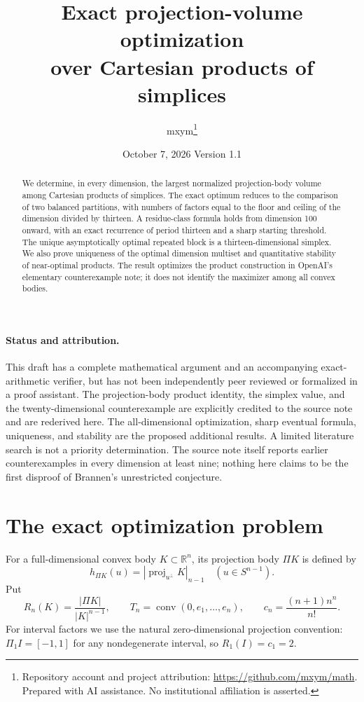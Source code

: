 \documentclass[11pt]{article}
\title{Exact projection-volume optimization\\over Cartesian products of simplices}
\author{mxym\thanks{Repository account and project attribution: \url{https://github.com/mxym/math}. Prepared with AI assistance. No institutional affiliation is asserted.}}
\date{October 7, 2026 \quad Version 1.1}
\theoremstyle{remark}\newtheorem{remark}[theorem]{Remark}
\newcommand{\R}{\mathbb R}\newcommand{\N}{\mathbb N}\newcommand{\Z}{\mathbb Z}
\DeclareMathOperator{\conv}{conv}
\begin{document}
\maketitle
\begin{abstract}
We determine, in every dimension, the largest normalized projection-body volume among Cartesian products of simplices. The exact optimum reduces to the comparison of two balanced partitions, with numbers of factors equal to the floor and ceiling of the dimension divided by thirteen. A residue-class formula holds from dimension 100 onward, with an exact recurrence of period thirteen and a sharp starting threshold. The unique asymptotically optimal repeated block is a thirteen-dimensional simplex. We also prove uniqueness of the optimal dimension multiset and quantitative stability of near-optimal products. The result optimizes the product construction in OpenAI's elementary counterexample note; it does not identify the maximizer among all convex bodies.
\end{abstract}
\paragraph{Status and attribution.}
This draft has a complete mathematical argument and an accompanying exact-arithmetic verifier, but has not been independently peer reviewed or formalized in a proof assistant. The projection-body product identity, the simplex value, and the twenty-dimensional counterexample are explicitly credited to the source note~\cite{OpenAI088} and are rederived here. The all-dimensional optimization, sharp eventual formula, uniqueness, and stability are the proposed additional results. A limited literature search is not a priority determination. The source note itself reports earlier counterexamples in every dimension at least nine; nothing here claims to be the first disproof of Brannen's unrestricted conjecture.

\section{The exact optimization problem}
For a full-dimensional convex body $K\subset\R^n$, its projection body $\Pi K$ is defined by
\[
 h_{\Pi K}(u)=|\operatorname{proj}_{u^\perp}K|_{n-1}\quad(u\in S^{n-1}).
\]
Put
\[
 R_n(K)=\frac{|\Pi K|}{|K|^{n-1}},\qquad
 T_n=\conv(0,e_1,\ldots,e_n),\qquad
 c_n=\frac{(n+1)n^n}{n!}.
\]
For interval factors we use the natural zero-dimensional projection convention: $\Pi_1I=[-1,1]$ for any nondegenerate interval, so $R_1(I)=c_1=2$.
\end{document}

